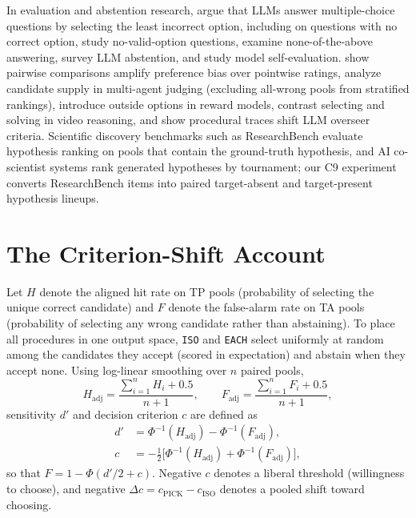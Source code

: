 \documentclass[10pt,twocolumn]{article}
\begin{document}
In evaluation and abstention research, \citet{wang2025llms} argue that LLMs answer multiple-choice questions by selecting the least incorrect option, including on questions with no correct option, \citet{kim2026penalty} study no-valid-option questions, \citet{tam2025none} examine none-of-the-above answering, \citet{wen2025know} survey LLM abstention, and \citet{kadavath2022language} study model self-evaluation. \citet{jeong2025comparative} show pairwise comparisons amplify preference bias over pointwise ratings, \citet{ji2026candidate} analyze candidate supply in multi-agent judging (excluding all-wrong pools from stratified rankings), \citet{rho2025best} introduce outside options in reward models, \citet{ma2026selecting} contrast selecting and solving in video reasoning, and \citet{chen2026beyond} show procedural traces shift LLM overseer criteria. Scientific discovery benchmarks such as ResearchBench \citep{liu2025researchbench} evaluate hypothesis ranking on pools that contain the ground-truth hypothesis, and AI co-scientist systems \citep{gottweis2025towards} rank generated hypotheses by tournament; our C9 experiment converts ResearchBench items into paired target-absent and target-present hypothesis lineups.

\section{The Criterion-Shift Account}
Let $H$ denote the aligned hit rate on TP pools (probability of selecting the unique correct candidate) and $F$ denote the false-alarm rate on TA pools (probability of selecting any wrong candidate rather than abstaining). To place all procedures in one output space, \texttt{ISO} and \texttt{EACH} select uniformly at random among the candidates they accept (scored in expectation) and abstain when they accept none. Using \citet{hautus1995corrections} log-linear smoothing over $n$ paired pools,
\begin{equation}
H_{\mathrm{adj}} = \frac{\sum_{i=1}^n H_i + 0.5}{n + 1}, \qquad F_{\mathrm{adj}} = \frac{\sum_{i=1}^n F_i + 0.5}{n + 1},
\end{equation}
sensitivity $d'$ and decision criterion $c$ are defined as
\begin{align}
d' &= \Phi^{-1}(H_{\mathrm{adj}}) - \Phi^{-1}(F_{\mathrm{adj}}), \nonumber \\
c  &= -\tfrac{1}{2}\bigl[\Phi^{-1}(H_{\mathrm{adj}}) + \Phi^{-1}(F_{\mathrm{adj}})\bigr],
\end{align}
so that $F = 1 - \Phi(d'/2 + c)$. Negative $c$ denotes a liberal threshold (willingness to choose), and negative $\Delta c = c_{\mathrm{PICK}} - c_{\mathrm{ISO}}$ denotes a pooled shift toward choosing.
\end{document}
